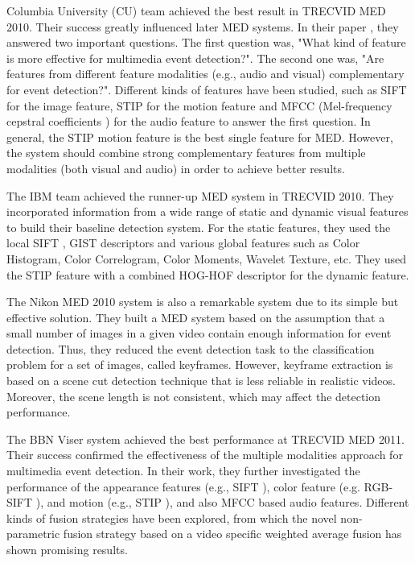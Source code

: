 Columbia University (CU) team achieved the best result in TRECVID MED 2010. Their success greatly influenced later MED systems. In their paper \cite{trecvid10:cuucf}, they answered two important questions. The first question was, "What kind of feature is more effective for multimedia event detection?". The second one was, "Are features from different feature modalities (e.g., audio and visual) complementary for event detection?". Different kinds of features have been studied, such as SIFT \cite{Lowe:2004} for the image feature, STIP \cite{Laptev:2005:SIP} for the motion feature and MFCC (Mel-frequency cepstral coefficients \cite{Lee1998MFCC}) for the audio feature to answer the first question. In general, the STIP motion feature is the best single feature for MED. However, the system should combine strong complementary features from multiple modalities (both visual and audio) in order to achieve better results. 

The IBM team \cite{trecvid10:IBM} achieved the runner-up MED system in TRECVID 2010. They incorporated information from a wide range of static and dynamic visual features to build their baseline detection system. For the static features, they used the local SIFT \cite{Lowe:2004}, GIST \cite{DBLP:livaT01} descriptors and various global features such as Color Histogram, Color Correlogram, Color Moments, Wavelet Texture, etc. They used the STIP \cite{Laptev:2005:SIP} feature with a combined HOG-HOF \cite{Laptev08CVPR} descriptor for the dynamic feature.

The Nikon MED 2010 system \cite{DBLP:conf/trecvid/MatsuoN10} is also a remarkable system due to its simple but effective solution. They built a MED system based on the assumption that a small number of images in a given video contain enough information for event detection. Thus, they reduced the event detection task to the classification problem for a set of images, called keyframes. However, keyframe extraction is based on a scene cut detection technique \cite{Guimaraes:2003} that is less reliable in realistic videos. Moreover, the scene length is not consistent, which may affect the detection performance.

The BBN Viser system \cite{NIST-TRECVID11:BBN-DVMM} achieved the best performance at TRECVID MED 2011. Their success confirmed the effectiveness of the multiple modalities approach for multimedia event detection. In their work, they further investigated the performance of the appearance features (e.g., SIFT \cite{Lowe:2004}), color feature (e.g. RGB-SIFT \cite{vandeSandeTPAMI2010}), and motion (e.g., STIP \cite{Laptev:2005:SIP}), and also MFCC \cite{Lee1998MFCC} based audio features. Different kinds of fusion strategies have been explored, from which the novel non-parametric fusion strategy based on a video specific weighted average fusion has shown promising results.

